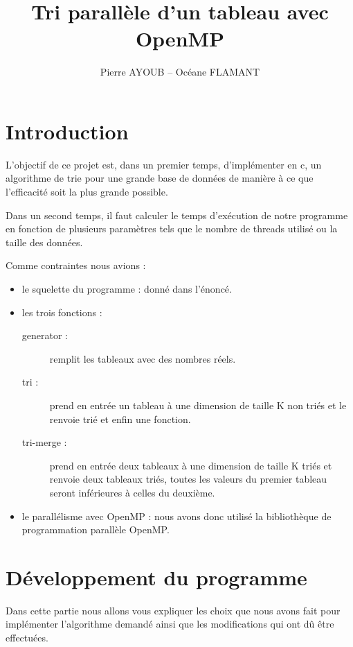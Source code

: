 \documentclass[12pt]{article}
\begin{document}
\title{Tri parallèle d'un tableau avec OpenMP}
\author{Pierre AYOUB -- Océane FLAMANT}

\maketitle

\tableofcontents

\newpage

\section{Introduction}
    
    L'objectif de ce projet est, dans un premier temps, d'implémenter en c, un algorithme de trie pour une grande base de données de manière à ce que l'efficacité soit la plus grande possible. 
    
    Dans un second temps, il faut calculer le temps d'exécution de notre programme en fonction de plusieurs paramètres tels que le nombre de threads utilisé ou la taille des données.

    Comme contraintes nous avions :
\begin{itemize}  
\item{le squelette du programme : donné dans l'énoncé.}
    
\item{les trois fonctions :
    \begin{description}
    \item[generator :] {remplit les tableaux avec des nombres réels.}
    \item[tri :] {prend en entrée un tableau à une dimension de taille K non triés et le renvoie trié et enfin une fonction.}
    \item[tri-merge :] {prend en entrée deux tableaux à une dimension de taille K triés et renvoie deux tableaux triés, toutes les valeurs du premier tableau seront inférieures à celles du deuxième.}
    \end{description}}
\item{le parallélisme avec OpenMP : nous avons donc utilisé la bibliothèque de programmation parallèle OpenMP.}
\end{itemize}
\section{Développement du programme}

    Dans cette partie nous allons vous expliquer les choix que nous avons fait pour implémenter l'algorithme demandé ainsi que les modifications qui ont dû être effectuées.
\end{document}
